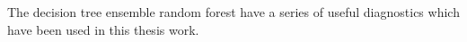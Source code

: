 The decision tree ensemble random forest have a series of useful diagnostics which have been used in this thesis work.

\newpage


